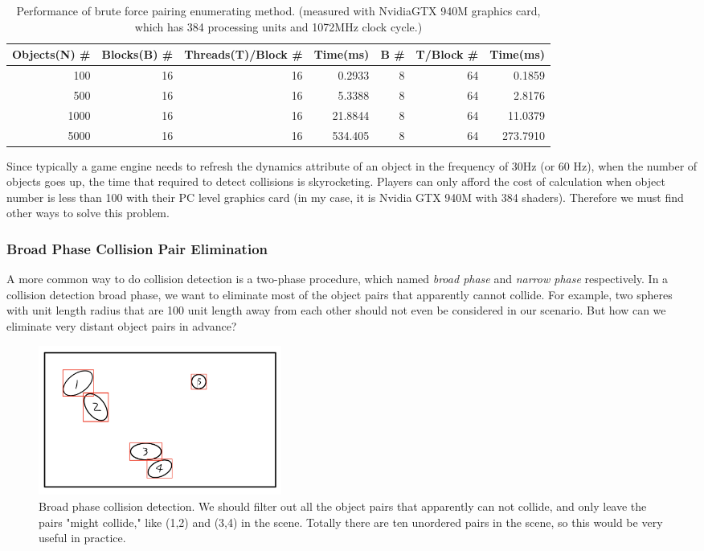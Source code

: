 \documentclass[11pt]{article}
\begin{document}
\begin{table}[htbp]
\centering
\begin{tabular}{rrrrrrr}
Objects(N) \# & Blocks(B) \# & Threads(T)/Block \# & Time(ms) & B \# & T/Block \# & Time(ms)\\
\hline
100 & 16 & 16 & 0.2933 & 8 & 64 & 0.1859\\
500 & 16 & 16 & 5.3388 & 8 & 64 & 2.8176\\
1000 & 16 & 16 & 21.8844 & 8 & 64 & 11.0379\\
5000 & 16 & 16 & 534.405 & 8 & 64 & 273.7910\\
\end{tabular}
\caption{Performance of brute force pairing enumerating method. (measured with Nvidia\textregistered GTX 940M graphics card, which has 384 processing units and 1072MHz clock cycle.)}

\end{table}

Since typically a game engine needs to refresh the dynamics attribute of an object in the frequency of 30Hz (or 60 Hz), when the number of objects goes up, the time that required to detect collisions is skyrocketing. Players can only afford the cost of calculation when object number is less than 100 with their PC level graphics card (in my case, it is Nvidia GTX 940M with 384 shaders). Therefore we must find other ways to solve this problem.

\subsubsection{Broad Phase Collision Pair Elimination}
\label{sec:orge4138f9}
A more common way to do collision detection is a two-phase procedure, which named \emph{broad phase} and \emph{narrow phase} respectively. In a collision detection broad phase, we want to eliminate most of the object pairs that apparently cannot collide. For example, two spheres with unit length radius that are 100 unit length away from each other should not even be considered in our scenario. But how can we eliminate very distant object pairs in advance?

\begin{figure}[htbp]
\centering
\includegraphics[width=8cm]{./rep_5.png}
\caption{Broad phase collision detection. We should filter out all the object pairs that apparently can not collide, and only leave the pairs "might collide," like (1,2) and (3,4) in the scene. Totally there are ten unordered pairs in the scene, so this would be very useful in practice.}
\end{figure}
\end{document}
